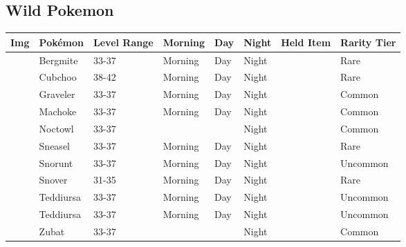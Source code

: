 \subsection{Wild Pokemon}%
\label{subsec:WildPokemon}%
\begin{longtable}{||l l l l l l l l||}%
\hline%
Img&Pokémon&Level Range&Morning&Day&Night&Held Item&Rarity Tier\\%
\hline%
\endhead%
\hline%
&Bergmite&33{-}37&Morning&Day&Night&&Rare\\%
\hline%
&Cubchoo&38{-}42&Morning&Day&Night&&Rare\\%
\hline%
&Graveler&33{-}37&Morning&Day&Night&&Common\\%
\hline%
&Machoke&33{-}37&Morning&Day&Night&&Common\\%
\hline%
&Noctowl&33{-}37&&&Night&&Common\\%
\hline%
&Sneasel&33{-}37&Morning&Day&Night&&Rare\\%
\hline%
&Snorunt&33{-}37&Morning&Day&Night&&Uncommon\\%
\hline%
&Snover&31{-}35&Morning&Day&Night&&Rare\\%
\hline%
&Teddiursa&33{-}37&Morning&Day&Night&&Uncommon\\%
\hline%
&Teddiursa&33{-}37&Morning&Day&Night&&Uncommon\\%
\hline%
&Zubat&33{-}37&&&Night&&Common\\%
\hline%
\end{longtable}